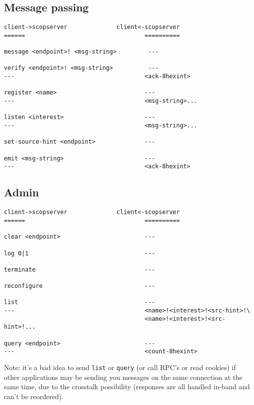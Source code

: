 \documentclass[12pt,a4paper,twoside]{article}
\renewcommand{\_}{\texttt{\symbol{95}}}
\begin{document}
\subsection{Message passing}

\begin{verbatim}
client->scopserver              client<-scopserver
======                                  ==========

message <endpoint>! <msg-string>         ---

verify <endpoint>! <msg-string>          ---
---                                     <ack-8hexint>

register <name>                         ---
---                                     <msg-string>...

listen <interest>                       ---
---                                     <msg-string>...

set-source-hint <endpoint>              ---

emit <msg-string>                       ---
---                                     <ack-8hexint>
\end{verbatim}

\subsection{Admin}

\begin{verbatim}
client->scopserver              client<-scopserver
======                                  ==========

clear <endpoint>                        ---

log 0|1                                 ---

terminate                               ---

reconfigure                             ---

list                                    ---
---                                     <name>!<interest>!<src-hint>!\
                                        <name>!<interest>!<src-hint>!...

query <endpoint>                        ---
---                                     <count-8hexint>
\end{verbatim}

Note: it's a bad idea to send \texttt{list} or \texttt{query}
(or call RPC's or read cookies) if other applications may be
sending you messages on the same connection at the same time,
due to the crosstalk possibility (responses are all handled
in-band and can't be reordered).
\end{document}
